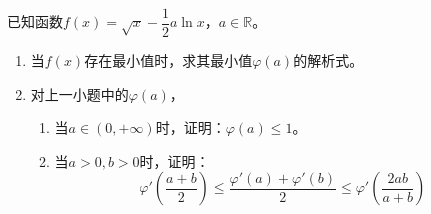 \begin{que}
	已知函数$f(x)=\sqrt{x}-\dfrac{1}{2}a\ln x$，$a\in\mathbb{R}$。
	\begin{enumerate}
		\item 当$f(x)$存在最小值时，求其最小值$\varphi(a)$的解析式。
		\item 对上一小题中的$\varphi(a)$，\begin{enumerate}
			\item 当$a\in(0,+\infty)$时，证明：$\varphi(a)\leqslant 1$。
			\item 当$a>0,b>0$时，证明：$$\varphi'\left(\dfrac{a+b}{2}\right)\leqslant\dfrac{\varphi'(a)+\varphi'(b)}{2}\leqslant \varphi'\left(\dfrac{2ab}{a+b}\right)$$
		\end{enumerate}
	\end{enumerate}
\end{que}

